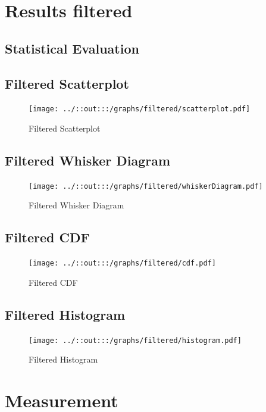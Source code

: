 \documentclass[
    oneside,        
    12pt
    ]{scrbook}
\begin{document}
\chapter{Results filtered}\label{chapter2}
\section{Statistical Evaluation}\label{section21}
	\newpage
\section{Filtered Scatterplot}\label{section22}
		\begin{figure}[ht]
	\texttt{[image: ../::out:::/graphs/filtered/scatterplot.pdf]}
	\caption[Results filtered: Scatterplot.]{Filtered Scatterplot}
  \label{fig:filteredScatterplot}
	\end{figure}
	\newpage
	
	\section{Filtered Whisker Diagram}\label{section23}
		\begin{figure}[ht]
	\texttt{[image: ../::out:::/graphs/filtered/whiskerDiagram.pdf]}
	\caption[Results filtered: Whisker Diagram.]{Filtered Whisker Diagram}
  \label{fig:filteredWhiskerDiagram}
	\end{figure}
	\newpage
	
	\section{Filtered CDF}\label{section24}
		\begin{figure}[ht]
	\texttt{[image: ../::out:::/graphs/filtered/cdf.pdf]}
	\caption[Results filtered: CDF.]{Filtered CDF}
  \label{fig:filteredCDF}
	\end{figure}
	\newpage
	
	\section{Filtered Histogram}\label{section25}
		\begin{figure}[ht]
	\texttt{[image: ../::out:::/graphs/filtered/histogram.pdf]}
	\caption[Results filtered: Histogram.]{Filtered Histogram}
  \label{fig:filteredHistogram}
	\end{figure}
	\newpage


\chapter{Measurement}\label{chapter3}
\end{document}
